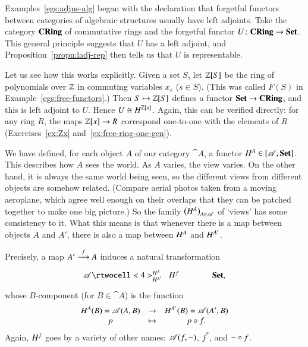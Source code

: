\begin{example}
\label{eg:ladj-rep-ring}
Examples~\ref{egs:adjns-alg} began with the declaration that forgetful%
%
%
functors between categories of algebraic structures usually have left
adjoints.  Take the category $\mathbf{CRing}$ of commutative rings%
%
%
and the forgetful functor $U\from \CRing \to \Set$.  This general principle
suggests that $U$ has a left adjoint, and Proposition~\ref{propn:ladj-rep}
then tells us that $U$ is representable.

Let us see how this works explicitly.  Given a set $S$, let $\mathbb{Z}[S]$
be the ring of polynomials%
%
%
over $\mathbb{Z}$ in commuting variables $x_s$ ($s \in S$).  (This was
called $F(S)$ in Example~\ref{egs:free-functors}.)  Then
$S \mapsto \mathbb{Z}[S]$ defines a functor $\mathbf{Set} \to \mathbf{CRing}$, and this is
left adjoint to $U$.  Hence $U \cong H^{\mathbb{Z}[x]}$.  Again, this
can be verified directly: for any ring $R$, the maps $\mathbb{Z}[x] \to R$
correspond one-to-one with the elements of $R$ (Exercises~\ref{ex:Zx}
and~\ref{ex:free-ring-one-gen}).
%
\end{example}

We have defined, for each object $A$ of our category $\cat{A}$, a functor
$H^A \in [\mathscr{A},\mathbf{Set}]$.  This describes how $A$ sees the world.
As $A$ varies, the view varies.  On the other hand, it is always the same
world being seen, so the different views from different objects are somehow
related.  (Compare aerial%
%
%
photos taken from a moving aeroplane, which agree well enough on their
overlaps that they can be patched together to make one big picture.)  So
the family $\bigl(H^A\bigr)_{A \in \mathscr{A}}$ of `views' has some
consistency to it.  What this means is that whenever there is a map between
objects $A$ and $A'$, there is also a map between $H^A$ and $H^{A'}$.

Precisely, a map $A' \stackrel{f}{\longrightarrow} A$ induces a natural transformation
\[
\xymatrix@C+1em{
\cat{A} \rtwocell<4>^{\h^A}_{\h^{A'}}{\hspace{.5em}\h^f} &\Set,
}%
%
\ntn{hom-out-map}
%
\]
whose $B$-component (for $B \in \cat{A}$) is the function
\[
\begin{array}{ccc}
H^A(B) = \mathscr{A}(A, B)  &\to            &H^{A'}(B) = \mathscr{A}(A', B)     \\
p                       &\mapsto        &p \mathbin{\circ} f.
\end{array}
\]
Again, $H^f$
goes by a variety of other names: $\mathscr{A}(f, -)$,%
%
%
$f^*$,%
%
%
and $- \mathbin{\circ} f$.%
%
%

